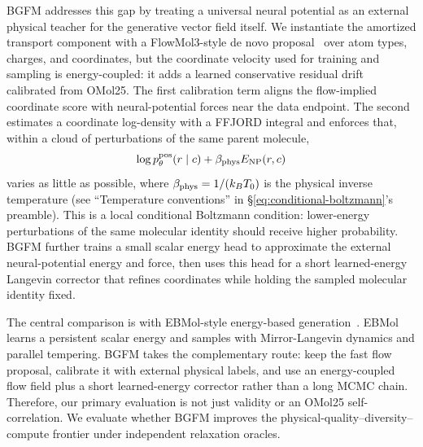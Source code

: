 \documentclass{article}
\begin{document}
BGFM addresses this gap by treating a universal neural potential as an
external physical teacher for the generative vector field itself.  We
instantiate the amortized transport component with a FlowMol3-style
de novo proposal~\citep{flowmol3} over atom types, charges, and coordinates,
but the coordinate velocity used for training and sampling is energy-coupled:
it adds a learned conservative residual drift calibrated from OMol25.
The first calibration term aligns the flow-implied coordinate score with
neural-potential forces near the data endpoint. The second estimates a
coordinate log-density with a FFJORD integral and enforces that, within a
cloud of perturbations of the same parent molecule,
\begin{equation}
    \log p_\theta^{\rm pos}(r \mid c) + \beta_{\rm phys} E_{\rm NP}(r,c)
\end{equation}
varies as little as possible, where $\beta_{\rm phys} = 1/(k_B T_0)$ is the
physical inverse temperature (see ``Temperature conventions'' in
\S\ref{eq:conditional-boltzmann}'s preamble). This is a local
conditional Boltzmann condition: lower-energy perturbations of the same
molecular identity should receive higher probability. BGFM further trains a small scalar
energy head to approximate the external neural-potential energy and
force, then uses this head for a short learned-energy Langevin corrector
that refines coordinates while holding the sampled molecular identity
fixed.

The central comparison is with EBMol-style energy-based generation~\citep{ebmol}.
EBMol learns a persistent scalar energy and samples with Mirror-Langevin
dynamics and parallel tempering. BGFM takes the complementary route:
keep the fast flow proposal, calibrate it with external physical labels,
and use an energy-coupled flow field plus a short learned-energy corrector rather than a long MCMC chain.
Therefore, our primary evaluation is not just validity or an OMol25
self-correlation. We evaluate whether BGFM improves the
physical-quality--diversity--compute frontier under independent
relaxation oracles.
\end{document}
